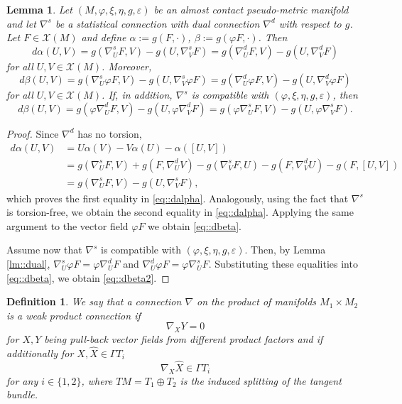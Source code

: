 \documentclass[12pt,a4paper,final]{amsart}
\numberwithin{equation}{section}
\newtheorem{lm}[tw]{Lemma}
\theoremstyle{df}
\newtheorem{df}[tw]{Definition}
\newcommand{\X}{\mathcal{X}}
\newcommand{\XM}{\X(M)}
\newcommand{\eps}{\varepsilon}
\begin{document}
\begin{lm}\label{lm::dalpha}
Let $(M,\varphi,\xi,\eta,g,\eps)$ be an almost contact pseudo-metric manifold
and let $\nabla^s$ be a statistical connection with dual connection $\nabla^d$
with respect to $g$. Let $F\in\XM$ and define $\alpha:=g(F,\cdot)$, $\beta:=g(\varphi F,\cdot)$.
Then
\begin{equation}\label{eq::dalpha}
d\alpha(U,V)=g(\nabla^s_UF,V)-g(U,\nabla^s_VF)=g(\nabla^d_UF,V)-g(U,\nabla^d_VF)
\end{equation}
for all $U,V\in\XM$.
Moreover,
\begin{equation}\label{eq::dbeta}
d\beta(U,V)=g(\nabla^s_U\varphi F,V)-g(U,\nabla^s_V\varphi F)=g(\nabla^d_U\varphi F,V)-g(U,\nabla^d_V\varphi F)
\end{equation}
for all $U,V\in\XM$.
If, in addition, $\nabla^s$ is compatible with $(\varphi,\xi,\eta,g,\eps)$, then
\begin{equation}\label{eq::dbeta2}
d\beta(U,V)=g(\varphi\nabla^d_UF,V)-g(U,\varphi\nabla^d_VF)=g(\varphi\nabla^s_UF,V)-g(U,\varphi\nabla^s_VF).
\end{equation}
\end{lm}

\begin{proof}
Since $\nabla^d$ has no torsion,
\begin{align*}
d\alpha(U,V)
&=U\alpha(V)-V\alpha(U)-\alpha([U,V])\\
&=g(\nabla^s_UF,V)+g(F,\nabla^d_UV)
-g(\nabla^s_VF,U)-g(F,\nabla^d_VU)-g(F,[U,V])\\
&=g(\nabla^s_UF,V)-g(U,\nabla^s_VF),
\end{align*}
which proves the first equality in \eqref{eq::dalpha}. Analogously, using the
fact that $\nabla^s$ is torsion-free, we obtain the second equality in \eqref{eq::dalpha}.
Applying the same argument to the vector field $\varphi F$ we obtain \eqref{eq::dbeta}.
\par Assume now that $\nabla^s$ is compatible with
$(\varphi,\xi,\eta,g,\eps)$. Then, by Lemma \ref{lm::dual},
$\nabla^s_U\varphi F=\varphi\nabla^d_UF$ and $\nabla^d_U\varphi F=\varphi\nabla^s_UF$.
Substituting these equalities into \eqref{eq::dbeta}, we obtain \eqref{eq::dbeta2}.
\end{proof}
\begin{df}
We say that a connection $\nabla$ on the product of manifolds $M_1\times M_2$ is a weak product connection if
\[
\nabla_XY=0
\]
for $X,Y$ being pull-back vector fields from different product factors  and if additionally for $X,\widehat X\in\Gamma T_i$ 
\[
\nabla_X\widehat X\in\Gamma T_i
\]
for any $i\in\{1,2\}$, where $TM=T_1\oplus T_2$ is the induced splitting of the tangent bundle.
\end{df}
\end{document}
